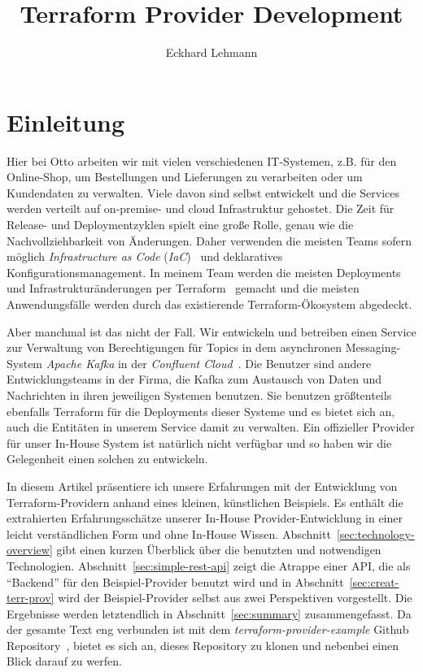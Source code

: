 \documentclass[paper=a4,11pt,numbers=noenddot]{article}
\title{Terraform Provider Development}
\author{Eckhard Lehmann}
\begin{document}
\maketitle
\tableofcontents

\section{Einleitung}

Hier bei Otto arbeiten wir mit vielen verschiedenen IT-Systemen, z.B. für den Online-Shop, um Bestellungen und Lieferungen zu verarbeiten oder um Kundendaten zu verwalten. Viele davon sind selbst entwickelt und die Services werden verteilt auf on-premise- und cloud Infrastruktur gehostet. Die Zeit für Release- und Deploymentzyklen spielt eine große Rolle, genau wie die Nachvollziehbarkeit von Änderungen. Daher verwenden die meisten Teams sofern möglich \emph{Infrastructure as Code} (\emph{IaC})~\autocite{morris_infrastructure_as_code_2025} und deklaratives Konfigurationsmanagement. In meinem Team werden die meisten Deployments und Infrastrukturänderungen per Terraform~\autocite{noauthor_terraform_nodate} gemacht und die meisten Anwendungsfälle werden durch das existierende Terraform-Ökosystem abgedeckt.

Aber manchmal ist das nicht der Fall. Wir entwickeln und betreiben einen Service zur Verwaltung von Berechtigungen für Topics in dem asynchronen Messaging-System \emph{Apache Kafka} in der \emph{Confluent Cloud}~\autocite{noauthor_apache_kafka_nodate, noauthor_confluent_nodate}. Die Benutzer sind andere Entwicklungsteams in der Firma, die Kafka zum Austausch von Daten und Nachrichten in ihren jeweiligen Systemen benutzen. Sie benutzen größtenteils ebenfalls Terraform für die Deployments dieser Systeme und es bietet sich an, auch die Entitäten in unserem Service damit zu verwalten. Ein offizieller Provider für unser In-House System ist natürlich nicht verfügbar und so haben wir die Gelegenheit einen solchen zu entwickeln.

In diesem Artikel präsentiere ich unsere Erfahrungen mit der Entwicklung von Terraform-Providern anhand eines kleinen, künstlichen Beispiels. Es enthält die extrahierten Erfahrungsschätze unserer In-House Provider-Entwicklung in einer leicht verständlichen Form und ohne In-House Wissen. Abschnitt~\ref{sec:technology-overview} gibt einen kurzen Überblick über die benutzten und notwendigen Technologien. Abschnitt~\ref{sec:simple-rest-api} zeigt die Atrappe einer API, die als ``Backend'' für den Beispiel-Provider benutzt wird und in Abschnitt~\ref{sec:creat-terr-prov} wird der Beispiel-Provider selbst aus zwei Perspektiven vorgestellt. Die Ergebnisse werden letztendlich in Abschnitt~\ref{sec:summary} zusammengefasst. Da der gesamte Text eng verbunden ist mit dem \emph{terraform-provider-example} Github Repository~\autocite{ecky-l_terraform-provider-example_nodate}, bietet es sich an, dieses Repository zu klonen und nebenbei einen Blick darauf zu werfen.
\end{document}

